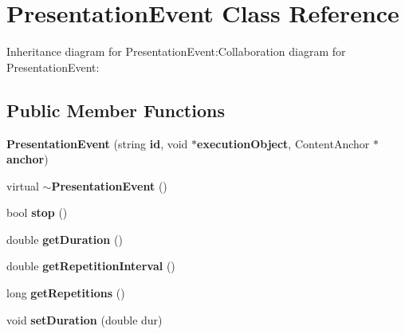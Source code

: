 \section{PresentationEvent Class Reference}
\label{classbr_1_1pucrio_1_1telemidia_1_1ginga_1_1ncl_1_1model_1_1event_1_1PresentationEvent}
Inheritance diagram for PresentationEvent:Collaboration diagram for PresentationEvent:\subsection*{Public Member Functions}
\begin{CompactItemize}
\item 
\textbf{PresentationEvent} (string {\bf id}, void $\ast${\bf executionObject}, ContentAnchor $\ast${\bf anchor})\label{classbr_1_1pucrio_1_1telemidia_1_1ginga_1_1ncl_1_1model_1_1event_1_1PresentationEvent_bb2688d1fdba291826eb3f7fd06ed882}

\item 
virtual {\bf $\sim$PresentationEvent} ()\label{classbr_1_1pucrio_1_1telemidia_1_1ginga_1_1ncl_1_1model_1_1event_1_1PresentationEvent_0b118747fafb5ccef4fc51166623279e}

\item 
bool \textbf{stop} ()\label{classbr_1_1pucrio_1_1telemidia_1_1ginga_1_1ncl_1_1model_1_1event_1_1PresentationEvent_68a350717fe6bf9012843e7c977d87b2}

\item 
double \textbf{getDuration} ()\label{classbr_1_1pucrio_1_1telemidia_1_1ginga_1_1ncl_1_1model_1_1event_1_1PresentationEvent_2e60fa87eb3c95c873109e928530a875}

\item 
double \textbf{getRepetitionInterval} ()\label{classbr_1_1pucrio_1_1telemidia_1_1ginga_1_1ncl_1_1model_1_1event_1_1PresentationEvent_886d1187d9e9da97ca85c6f451c3f644}

\item 
long \textbf{getRepetitions} ()\label{classbr_1_1pucrio_1_1telemidia_1_1ginga_1_1ncl_1_1model_1_1event_1_1PresentationEvent_df811128997837cc0d2e9a9b18c14d90}

\item 
void \textbf{setDuration} (double dur)\label{classbr_1_1pucrio_1_1telemidia_1_1ginga_1_1ncl_1_1model_1_1event_1_1PresentationEvent_9085316d32bc9b3030442f4811323bac}


\end{CompactItemize}
